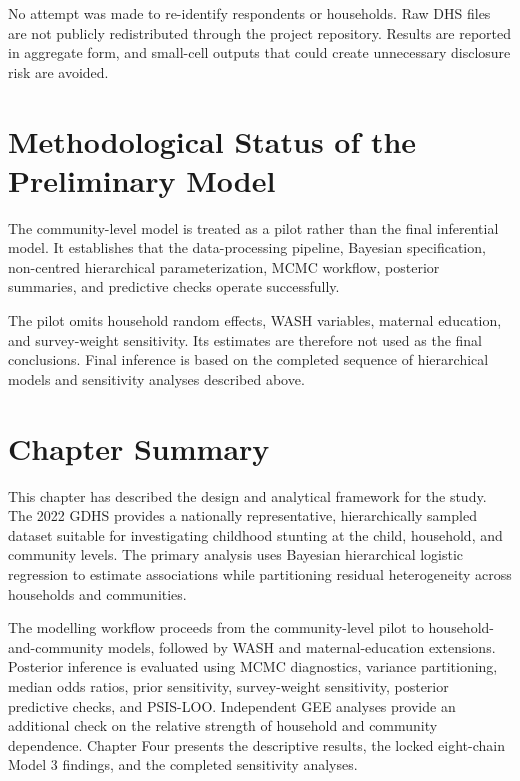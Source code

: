No attempt was made to re-identify respondents or households. Raw DHS files are not publicly redistributed through the project repository. Results are reported in aggregate form, and small-cell outputs that could create unnecessary disclosure risk are avoided.

\section{Methodological Status of the Preliminary Model}

The community-level model is treated as a pilot rather than the final inferential model. It establishes that the data-processing pipeline, Bayesian specification, non-centred hierarchical parameterization, MCMC workflow, posterior summaries, and predictive checks operate successfully.

The pilot omits household random effects, WASH variables, maternal education, and survey-weight sensitivity. Its estimates are therefore not used as the final conclusions. Final inference is based on the completed sequence of hierarchical models and sensitivity analyses described above.

\section{Chapter Summary}

This chapter has described the design and analytical framework for the study. The 2022 GDHS provides a nationally representative, hierarchically sampled dataset suitable for investigating childhood stunting at the child, household, and community levels. The primary analysis uses Bayesian hierarchical logistic regression to estimate associations while partitioning residual heterogeneity across households and communities.

The modelling workflow proceeds from the community-level pilot to household-and-community models, followed by WASH and maternal-education extensions. Posterior inference is evaluated using MCMC diagnostics, variance partitioning, median odds ratios, prior sensitivity, survey-weight sensitivity, posterior predictive checks, and PSIS-LOO. Independent GEE analyses provide an additional check on the relative strength of household and community dependence. Chapter Four presents the descriptive results, the locked eight-chain Model 3 findings, and the completed sensitivity analyses.
